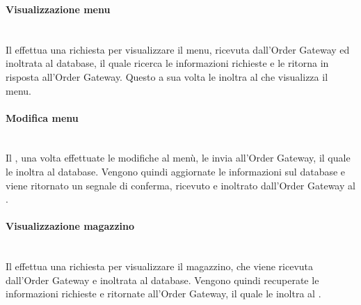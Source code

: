 \subsubsection{\Manager{}}

\paragraph{Visualizzazione menu}\mbox{}\\
Il \Manager{} effettua una richiesta per visualizzare il menu, ricevuta dall’Order Gateway ed inoltrata al database, il quale ricerca le informazioni richieste e le ritorna in risposta all’Order Gateway. Questo a sua volta le inoltra al \Manager{} che visualizza il menu.

\paragraph{Modifica menu}\mbox{}\\
Il \Manager{}, una volta effettuate le modifiche al menù, le invia all’Order Gateway, il quale le inoltra al database. Vengono quindi aggiornate le informazioni sul database e viene ritornato un segnale di conferma, ricevuto e inoltrato dall’Order Gateway al \Manager{}.

\paragraph{Visualizzazione magazzino}\mbox{}\\
Il \Manager{} effettua una richiesta per visualizzare il magazzino, che viene ricevuta dall’Order Gateway e inoltrata al database. Vengono quindi recuperate le informazioni richieste e ritornate all’Order Gateway, il quale le inoltra al \Manager{}.

